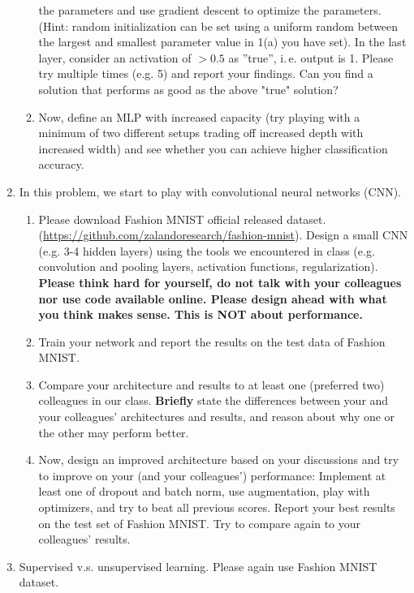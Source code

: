 \documentclass[a4paper]{article}
\begin{document}
\begin{enumerate}
\begin{enumerate}
			 the parameters and use gradient descent to optimize the parameters. (Hint: random initialization can be set using a uniform random between the largest and smallest parameter value in 1(a) you have set). In the last layer, consider an activation of $>0.5$ as ''true'', i.\,e. output is 1.
			 Please try multiple times (e.g. 5) and report your findings. Can you find a solution that performs as good as the above "true" solution?
			\item Now, define an MLP with increased capacity (try playing with a minimum of two different setups trading off increased depth with increased width) and see whether you can achieve higher classification accuracy.
		\end{enumerate}
		\item In this problem, we start to play with convolutional neural networks (CNN). 
		\begin{enumerate}
			\item Please download Fashion MNIST official released dataset.(\url{https://github.com/zalandoresearch/fashion-mnist}). 
			 Design a small CNN (e.g. 3-4 hidden layers) using the tools we encountered in class (e.g. convolution and pooling layers, activation functions, regularization).  \textbf{Please think hard for yourself, do not talk with your colleagues nor use code available online. Please design ahead with what you think makes sense. This is NOT about performance.}  
			\item Train your network and report the results on the test data of Fashion MNIST.
			\item  Compare your architecture and results to at least one (preferred two) colleagues in our class. \textbf{Briefly} state the differences between your and your colleagues' architectures and results, and reason about why one or the other may perform better.
			\item Now, design an improved architecture based on your discussions and try to improve on your (and your colleagues') performance: Implement at least one of dropout and batch norm, use augmentation, play with optimizers, and try to beat all previous scores. Report your best results on the test set of Fashion MNIST. Try to compare again to your colleagues' results.			
		\end{enumerate}
		\item Supervised v.s. unsupervised learning. Please again use Fashion MNIST dataset. 
		\begin{enumerate}

\end{enumerate}
\end{enumerate}
\end{document}
